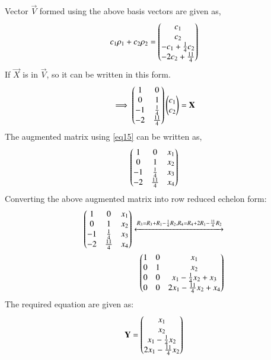 \documentclass[journal,12pt,twocolumn]{IEEEtran}
\begin{document}
Vector $\vec{V}$ formed using the above basis vectors are given as,
\begin{align}
c_1\rho_1+c_2\rho_2=\begin{pmatrix}c_1\\c_2\\-c_1+\frac{1}{4}c_2\\-2c_2+\frac{11}{4}\end{pmatrix}
\end{align}
If $\vec{X}$ is in $\vec{V}$, so it can be written in this form.\\
\begin{align}
\implies \begin{pmatrix}1&0\\0&1\\-1&\frac{1}{4}\\-2&\frac{11}{4}\end{pmatrix}\begin{pmatrix}c_1\\c_2\end{pmatrix}=\mathbf{X} \label{eq15} 
\end{align}
The augmented matrix using \ref{eq15} can be written as,
\begin{align}
\begin{pmatrix}1&0&x_1\\0&1&x_2\\-1&\frac{1}{4}&x_3\\-2&\frac{11}{4}&x_4\end{pmatrix}
\end{align}
Converting the above augmented matrix into row reduced echelon form:
\begin{align}
\begin{pmatrix}1&0&x_1\\0&1&x_2\\-1&\frac{1}{4}&x_3\\-2&\frac{11}{4}&x_4\end{pmatrix}\xleftrightarrow{R_3=R_3+R_1-\frac{1}{4}R_2, R_4=R_4+2R_1-\frac{11}{4}R_2} \nonumber\\
\begin{pmatrix}1&0&x_1\\0&1&x_2\\0&0&x_1-\frac{1}{4}x_2+x_3\\0&0&2x_1-\frac{11}{4}x_2+x_4\end{pmatrix}
\end{align}
The required equation are given as:
\begin{align}
\mathbf{Y}=\begin{pmatrix}x_1\\x_2\\x_1-\frac{1}{4}x_2\\2x_1-\frac{11}{4}x_2\end{pmatrix}
\end{align}
\end{document}
